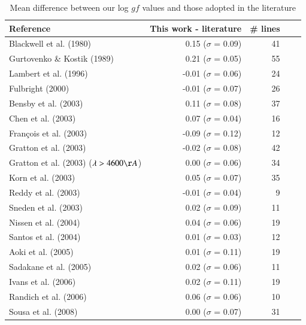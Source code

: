 \documentclass[traditabstract]{aa} %
\begin{document}
\begin{table}
\caption{Mean difference between our log $gf$ values and those adopted in the literature}
\label{literature}
\centering          
\renewcommand{\footnoterule}{}  %
\begin{tabular}{lrrcc} 
\hline\hline                
\scriptsize
{Reference}  & {This work - literature} & \# lines  \\
\hline    
Blackwell et al. (1980)     & 0.15 ($\sigma$ = 0.09) & 41 \\
Gurtovenko \& Kostik (1989) & 0.21 ($\sigma$ = 0.05) & 55 \\
Lambert et al. (1996) & -0.01 ($\sigma$ = 0.06) & 24 \\
Fulbright (2000)      & -0.01 ($\sigma$ = 0.07) & 26 \\
Bensby et al. (2003)  &  0.11 ($\sigma$ = 0.08) & 37 \\
Chen et al. (2003)    &  0.07 ($\sigma$ = 0.04) & 16 \\
Fran{\c c}ois et al. (2003) & -0.09 ($\sigma$ = 0.12) & 12 \\
Gratton et al. (2003) & -0.02 ($\sigma$ = 0.08) & 42 \\
Gratton et al. (2003) ($\lambda > 4600 \AA$) & 0.00 ($\sigma$ = 0.06) & 34  \\
Korn et al. (2003)    &  0.05 ($\sigma$ = 0.07) & 35 \\
Reddy et al. (2003)   & -0.01 ($\sigma$ = 0.04) &  9 \\
Sneden et al. (2003)  &  0.02 ($\sigma$ = 0.09) & 11 \\
Nissen et al. (2004)  &  0.04 ($\sigma$ = 0.06) & 19 \\
Santos et al. (2004)  &  0.01 ($\sigma$ = 0.03) & 12 \\
Aoki et al. (2005)    &  0.01 ($\sigma$ = 0.11) & 19 \\
Sadakane et al. (2005) & 0.02 ($\sigma$ = 0.06) & 11 \\
Ivans et al. (2006)   &  0.02 ($\sigma$ = 0.11) & 19 \\
Randich et al. (2006) &  0.06 ($\sigma$ = 0.06) & 10 \\ %
Sousa et al. (2008)   &  0.00 ($\sigma$ = 0.07) & 31 \\
\hline                                 
\hline                                 
\end{tabular}
\end{table}
\end{document}
